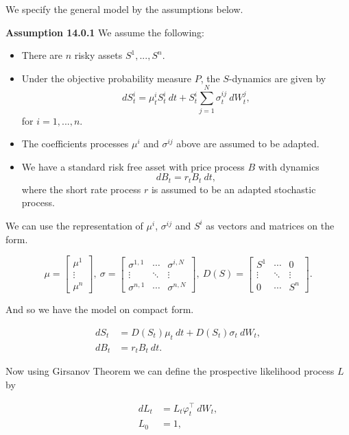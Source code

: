 \documentclass[
]{article}
\providecommand{\tightlist}{%
  \setlength{\itemsep}{0pt}\setlength{\parskip}{0pt}}
\begin{document}
We specify the general model by the assumptions below.

\textbf{Assumption 14.0.1} We assume the following:

\begin{itemize}
\tightlist
\item
  There are \(n\) risky assets \(S^1,...,S^n\).
\item
  Under the objective probability measure \(P\), the \(S\)-dynamics are
  given by \[
    dS_t^i=\mu_t^iS_t^i\ dt +S_t^i\sum_{j=1}^N\sigma_t^{ij}\ dW_t^j,
    \] for \(i=1,...,n\).
\item
  The coefficients processes \(\mu^i\) and \(\sigma^{ij}\) above are
  assumed to be adapted.
\item
  We have a standard risk free asset with price process \(B\) with
  dynamics \[
    dB_t=r_tB_t\ dt,
    \] where the short rate process \(r\) is assumed to be an adapted
  stochastic process.
\end{itemize}

We can use the representation of \(\mu^i\), \(\sigma^{ij}\) and \(S^i\)
as vectors and matrices on the form.

\[
\mu =
\begin{bmatrix}
\mu ^1\\
\vdots\\
\mu ^n
\end{bmatrix},\ \sigma=
\begin{bmatrix}
\sigma^{1,1}& \cdots & \sigma^{i,N}\\
\vdots & \ddots & \vdots\\
\sigma^{n,1}&\cdots&\sigma^{n,N}
\end{bmatrix},\ D(S)=
\begin{bmatrix}
S^{1}& \cdots & 0\\
\vdots & \ddots & \vdots\\
0&\cdots&S^n
\end{bmatrix}.
\]

And so we have the model on compact form.

\begin{align*}
dS_t&= D(S_t)\mu_t\ dt+D(S_t)\sigma_t\ dW_t,\\
dB_t&=r_tB_t\ dt.
\end{align*}

Now using Girsanov Theorem we can define the prospective likelihood
process \(L\) by

\begin{align*}
dL_t&=L_t\varphi_t^\top\ dW_t,\\
L_0&=1,
\end{align*}
\end{document}
